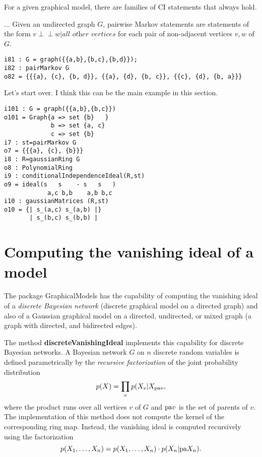 \documentclass{article}
\theoremstyle{definition}
\newcommand{\pa}{{\rm pa}}
\def\ci{\perp\!\!\!\perp}
\begin{document}
For a given graphical model, there are families of CI statements that always hold. 

...
Given an undirected graph $G$, pairwise Markov statements are statements of the form $v \ci w | \textit{all other vertices}$ for each pair of non-adjacent vertices $v, w$ of $G$. 
\begin{verbatim}
i81 : G = graph({{a,b},{b,c},{b,d}}); 
i82 : pairMarkov G
o82 = {{{a}, {c}, {b, d}}, {{a}, {d}, {b, c}}, {{c}, {d}, {b, a}}}
\end{verbatim}

Let's start over. I think this can be the main example in this section. 

\begin{verbatim}
i101 : G = graph({{a,b},{b,c}})
o101 = Graph{a => set {b}   }
             b => set {a, c}
             c => set {b}
i7 : st=pairMarkov G
o7 = {{{a}, {c}, {b}}}
i8 : R=gaussianRing G
o8 : PolynomialRing
i9 : conditionalIndependenceIdeal(R,st)
o9 = ideal(s   s    - s   s   )
            a,c b,b    a,b b,c
i10 : gaussianMatrices (R,st)
o10 = {| s_(a,c) s_(a,b) |}
       | s_(b,c) s_(b,b) |
\end{verbatim}


\section{Computing the vanishing ideal of a model}

The package GraphicalModels has the capability of computing the vanishing ideal
of  a \emph{discrete Bayesian network} (discrete graphical model on a directed
graph) and also of a Gaussian graphical model on a directed, undirected, or  mixed
graph (a graph with directed, and bidirected edges). 

The method
\textbf{discreteVanishingIdeal} implements this capability for discrete Bayesian
networks. A Bayesian network $G$ on $n$ discrete random variables 
is defined parametrically by the
\emph{recursive factorization} of the joint probability  distribution
\[p(X) = \prod_{v} p(X_{v} | X_{\pa v},\]
where the product runs over all vertices $v$ of $G$ and $\pa v$ is the set of
parents of $v$. 
The implementation of this method does not compute the kernel of the
corresponding ring map. Instead, the vanishing ideal is
computed recursively using the factorization 
\[p(X_{1},\dots, X_{n}) = p(X_{1},\dots, X_{n})\cdot p(X_{n} | \pa X_{n}).\]
\end{document}
